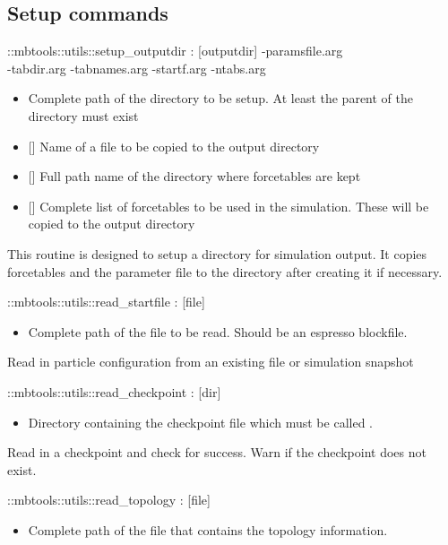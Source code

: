 \subsection{Setup commands}
\begin{code}
  ::mbtools::utils::setup\_outputdir  :  [outputdir] -paramsfile.arg\\
             -tabdir.arg -tabnames.arg -startf.arg -ntabs.arg
\end{code}
\begin{itemize}
\item {} Complete path of the directory to be setup. At least the parent of the directory must exist
\item {} [] Name of a file to be copied to the output directory
\item {} [] Full path name of the directory where forcetables are kept
\item {} [] Complete list of forcetables to be used in the simulation. These will be copied to the output directory
\end{itemize}
This routine is designed to setup a directory for simulation output. It copies forcetables and the parameter file to the directory after creating it if necessary.
\begin{code}
  ::mbtools::utils::read_startfile : [file]
\end{code}
\begin{itemize}
\item {} Complete path of the file to be read. Should be an espresso blockfile.
\end{itemize}
Read in particle configuration from an existing file or simulation snapshot
\begin{code}
  ::mbtools::utils::read_checkpoint : [dir]
\end{code}
\begin{itemize}
\item {} Directory containing the checkpoint file which must be called .
\end{itemize}
Read in a checkpoint and check for success. Warn if the checkpoint does not exist.
\begin{code}
  ::mbtools::utils::read_topology : [file]
\end{code}
\begin{itemize}
\item {} Complete path of the file that contains the topology information.
\end{itemize}
